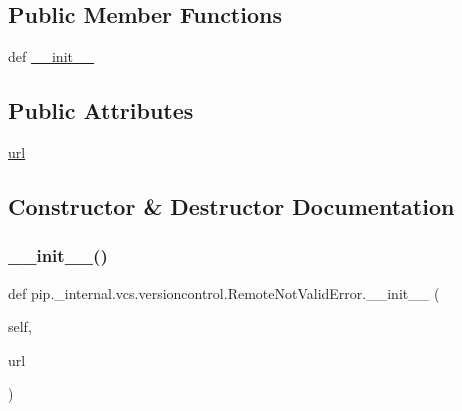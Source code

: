 \subsection*{Public Member Functions}
\begin{DoxyCompactItemize}
\item 
def \hyperlink{classpip_1_1__internal_1_1vcs_1_1versioncontrol_1_1RemoteNotValidError_ae6921c994fdecea44c6933ff05a2e174}{\+\_\+\+\_\+init\+\_\+\+\_\+}
\end{DoxyCompactItemize}
\subsection*{Public Attributes}
\begin{DoxyCompactItemize}
\item 
\hyperlink{classpip_1_1__internal_1_1vcs_1_1versioncontrol_1_1RemoteNotValidError_a46f9dd59bb833cef4f8fa6011995acd6}{url}
\end{DoxyCompactItemize}


\subsection{Constructor \& Destructor Documentation}
\mbox{\label{classpip_1_1__internal_1_1vcs_1_1versioncontrol_1_1RemoteNotValidError_ae6921c994fdecea44c6933ff05a2e174}} 
\subsubsection{\texorpdfstring{\+\_\+\+\_\+init\+\_\+\+\_\+()}{\_\_init\_\_()}}
{\footnotesize\ttfamily def pip.\+\_\+internal.\+vcs.\+versioncontrol.\+Remote\+Not\+Valid\+Error.\+\_\+\+\_\+init\+\_\+\+\_\+ (\begin{DoxyParamCaption}\item[{}]{self,  }\item[{}]{url }\end{DoxyParamCaption})}



